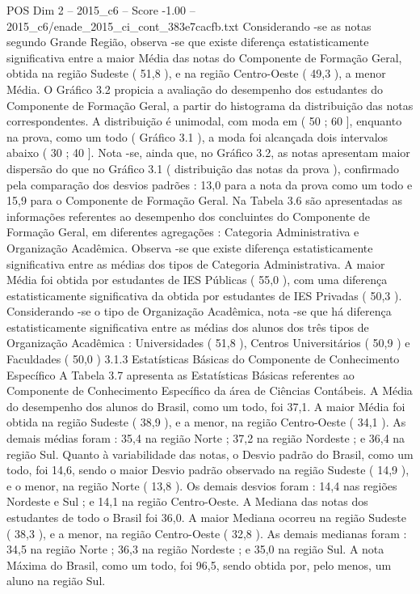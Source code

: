 \begin{textsample}{POS Dim 2 – 2015\_c6 – Score -1.00 – 2015\_c6/enade\_2015\_ci\_cont\_383e7cacfb.txt}
Considerando -se as notas segundo Grande Região, observa -se que existe diferença estatisticamente significativa entre a maior Média das notas do Componente de Formação Geral, obtida na região Sudeste ( 51,8 ), e na região Centro-Oeste ( 49,3 ), a menor Média.
O Gráfico 3.2 propicia a avaliação do desempenho dos estudantes do Componente de Formação Geral, a partir do histograma da distribuição das notas correspondentes.
A distribuição é unimodal, com moda em ( 50 ; 60 ], enquanto na prova, como um todo ( Gráfico 3.1 ), a moda foi alcançada dois intervalos abaixo ( 30 ; 40 ].
Nota -se, ainda que, no Gráfico 3.2, as notas apresentam maior dispersão do que no Gráfico 3.1 ( distribuição das notas da prova ), confirmado pela comparação dos desvios padrões : 13,0 para a nota da prova como um todo e 15,9 para o Componente de Formação Geral.
Na Tabela 3.6 são apresentadas as informações referentes ao desempenho dos concluintes do Componente de Formação Geral, em diferentes agregações : Categoria Administrativa e Organização Acadêmica.
Observa -se que existe diferença estatisticamente significativa entre as médias dos tipos de Categoria Administrativa.
A maior Média foi obtida por estudantes de IES Públicas ( 55,0 ), com uma diferença estatisticamente significativa da obtida por estudantes de IES Privadas ( 50,3 ).
Considerando -se o tipo de Organização Acadêmica, nota -se que há diferença estatisticamente significativa entre as médias dos alunos dos três tipos de Organização Acadêmica : Universidades ( 51,8 ), Centros Universitários ( 50,9 ) e Faculdades ( 50,0 ) 3.1.3 Estatísticas Básicas do Componente de Conhecimento Específico A Tabela 3.7 apresenta as Estatísticas Básicas referentes ao Componente de Conhecimento Específico da área de Ciências Contábeis.
A Média do desempenho dos alunos do Brasil, como um todo, foi 37,1.
A maior Média foi obtida na região Sudeste ( 38,9 ), e a menor, na região Centro-Oeste ( 34,1 ).
As demais médias foram : 35,4 na região Norte ; 37,2 na região Nordeste ; e 36,4 na região Sul.
Quanto à variabilidade das notas, o Desvio padrão do Brasil, como um todo, foi 14,6, sendo o maior Desvio padrão observado na região Sudeste ( 14,9 ), e o menor, na região Norte ( 13,8 ).
Os demais desvios foram : 14,4 nas regiões Nordeste e Sul ; e 14,1 na região Centro-Oeste.
A Mediana das notas dos estudantes de todo o Brasil foi 36,0.
A maior Mediana ocorreu na região Sudeste ( 38,3 ), e a menor, na região Centro-Oeste ( 32,8 ).
As demais medianas foram : 34,5 na região Norte ; 36,3 na região Nordeste ; e 35,0 na região Sul.
A nota Máxima do Brasil, como um todo, foi 96,5, sendo obtida por, pelo menos, um aluno na região Sul.

\end{textsample}

